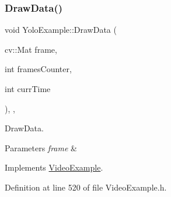 \subsubsection{\texorpdfstring{Draw\+Data()}{DrawData()}}
{\footnotesize\ttfamily void Yolo\+Example\+::\+Draw\+Data (\begin{DoxyParamCaption}\item[{cv\+::\+Mat}]{frame,  }\item[{int}]{frames\+Counter,  }\item[{int}]{curr\+Time }\end{DoxyParamCaption})\hspace{0.3cm}{\ttfamily [inline]}, {\ttfamily [protected]}, {\ttfamily [virtual]}}



Draw\+Data. 


\begin{DoxyParams}{Parameters}
{\em frame} & \\
\hline
\end{DoxyParams}


Implements \mbox{\hyperlink{class_video_example_a53eb15977cb147dac218d8ea337986cd}{Video\+Example}}.



Definition at line 520 of file Video\+Example.\+h.


